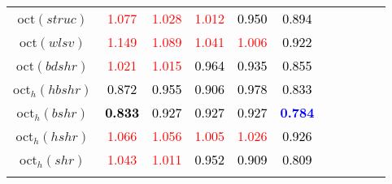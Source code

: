 \begin{tabular}[t]{c|>{}cccc>{}c|ccccc}
oct$(struc)$ & \textcolor{red}{1.077} & \textcolor{red}{1.028} & \textcolor{red}{1.012} & \textcolor{black}{0.950} & \textcolor{black}{0.894} &  &  &  &  & \\
oct$(wlsv)$ & \textcolor{red}{1.149} & \textcolor{red}{1.089} & \textcolor{red}{1.041} & \textcolor{red}{1.006} & \textcolor{black}{0.922} &  &  &  &  & \\
oct$(bdshr)$ & \textcolor{red}{1.021} & \textcolor{red}{1.015} & \textcolor{black}{0.964} & \textcolor{black}{0.935} & \textcolor{black}{0.855} &  &  &  &  & \\
oct$_h(hbshr)$ & \textcolor{black}{0.872} & \textcolor{black}{0.955} & \textcolor{black}{0.906} & \textcolor{black}{0.978} & \textcolor{black}{0.833} &  &  &  &  & \\
oct$_h(bshr)$ & \textcolor{black}{\textbf{0.833}} & \textcolor{black}{0.927} & \textcolor{black}{0.927} & \textcolor{black}{0.927} & \textcolor{blue}{\textbf{0.784}} &  &  &  &  & \\
oct$_h(hshr)$ & \textcolor{red}{1.066} & \textcolor{red}{1.056} & \textcolor{red}{1.005} & \textcolor{red}{1.026} & \textcolor{black}{0.926} &  &  &  &  & \\
oct$_h(shr)$ & \textcolor{red}{1.043} & \textcolor{red}{1.011} & \textcolor{black}{0.952} & \textcolor{black}{0.909} & \textcolor{black}{0.809} &  &  &  &  & \\
\bottomrule
{}\\
\end{tabular}
